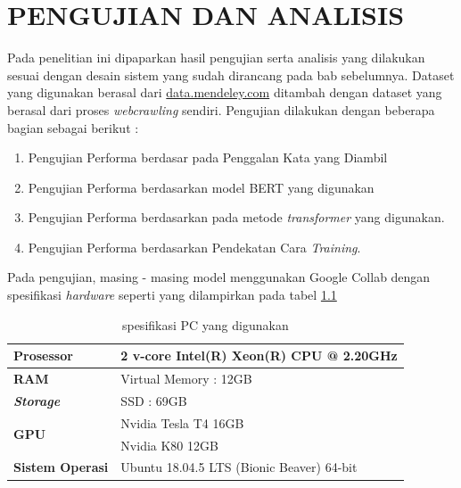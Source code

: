 \chapter{PENGUJIAN DAN ANALISIS}
\label{chap:pengujiananalisis}

Pada penelitian ini dipaparkan hasil pengujian serta analisis yang dilakukan sesuai dengan desain sistem yang sudah dirancang pada bab sebelumnya. Dataset yang digunakan berasal dari \url{data.mendeley.com} ditambah dengan dataset yang berasal dari proses \textit{webcrawling} sendiri. Pengujian dilakukan dengan beberapa bagian sebagai berikut :

\begin{enumerate}[nolistsep]
    \item Pengujian Performa berdasar pada Penggalan Kata yang Diambil
    \item Pengujian Performa berdasarkan model BERT yang digunakan
    \item Pengujian Performa berdasarkan pada metode \textit{transformer}  yang digunakan.
    \item Pengujian Performa berdasarkan Pendekatan Cara \textit{Training}.
\end{enumerate}

Pada pengujian, masing - masing model menggunakan Google Collab dengan spesifikasi \textit{hardware} seperti yang dilampirkan pada tabel \ref{tab:specs_collab}

\begin{table}
    \caption{spesifikasi PC yang digunakan}
    \label{tab:specs_collab}
    \centering
    \begin{tabular}{|l|l|}
        \hline
        \textbf{Prosessor}            & 2 v-core Intel(R) Xeon(R) CPU @ 2.20GHz   \\ \hline
        \textbf{RAM}                  & Virtual Memory : 12GB                     \\ \hline
        \textit{\textbf{Storage}}     & SSD : 69GB                                \\ \hline
        \multirow{2}{*}{\textbf{GPU}} & Nvidia Tesla T4 16GB                      \\ \cline{2-2}
                                      & Nvidia K80 12GB                           \\ \hline
        \textbf{Sistem Operasi}       & Ubuntu 18.04.5 LTS (Bionic Beaver) 64-bit \\ \hline
    \end{tabular}
\end{table}

